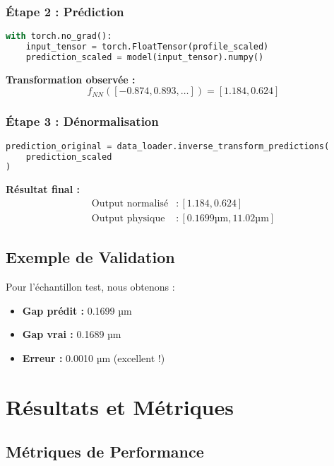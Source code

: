\documentclass[10pt,twocolumn]{article}
\begin{document}
\subsubsection{Étape 2 : Prédiction}

\begin{lstlisting}[language=Python, caption=Prédiction par le réseau]
with torch.no_grad():
    input_tensor = torch.FloatTensor(profile_scaled)
    prediction_scaled = model(input_tensor).numpy()
\end{lstlisting}

\textbf{Transformation observée :}
\begin{equation}
f_{NN}([-0.874, 0.893, \ldots]) = [1.184, 0.624]
\end{equation}

\subsubsection{Étape 3 : Dénormalisation}

\begin{lstlisting}[language=Python, caption=Dénormalisation de la sortie]
prediction_original = data_loader.inverse_transform_predictions(
    prediction_scaled
)
\end{lstlisting}

\textbf{Résultat final :}
\begin{align}
\text{Output normalisé} &: [1.184, 0.624] \\
\text{Output physique} &: [0.1699\text{µm}, 11.02\text{µm}]
\end{align}

\subsection{Exemple de Validation}

Pour l'échantillon test, nous obtenons :
\begin{itemize}
    \item \textbf{Gap prédit :} 0.1699 µm
    \item \textbf{Gap vrai :} 0.1689 µm
    \item \textbf{Erreur :} 0.0010 µm (excellent !)
\end{itemize}

\section{Résultats et Métriques}

\subsection{Métriques de Performance}
\end{document}
